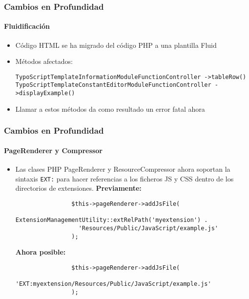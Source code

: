 \begin{frame}[fragile]
	\frametitle{Cambios en Profundidad}
	\framesubtitle{Fluidificación}

	\begin{itemize}
		\item Código HTML se ha migrado del código PHP a una plantilla Fluid
		\item Métodos afectados:\newline

			\smaller\texttt{TypoScriptTemplateInformationModuleFunctionController\newline
				->tableRow()}\normalsize\newline
			\smaller\texttt{TypoScriptTemplateConstantEditorModuleFunctionController\newline
				->displayExample()}\normalsize

		\item Llamar a estos métodos da como resultado un error fatal ahora

	\end{itemize}

\end{frame}


\begin{frame}[fragile]
	\frametitle{Cambios en Profundidad}
	\framesubtitle{PageRenderer y Compressor}

	\lstset{basicstyle=\smaller\ttfamily}

	\begin{itemize}

		\item Las clases PHP PageRenderer y ResourceCompressor ahora soportan la sintaxis
			\texttt{EXT:} para hacer referencias a los ficheros JS y CSS dentro de los directorios
			de extensiones.\newline
			\textbf{Previamente:}

			\begin{lstlisting}
				$this->pageRenderer->addJsFile(
				  ExtensionManagementUtility::extRelPath('myextension') .
				  'Resources/Public/JavaScript/example.js'
				);
			\end{lstlisting}

			\textbf{Ahora posible:}

			\begin{lstlisting}
				$this->pageRenderer->addJsFile(
				  'EXT:myextension/Resources/Public/JavaScript/example.js'
				);
			\end{lstlisting}

	\end{itemize}

\end{frame}

